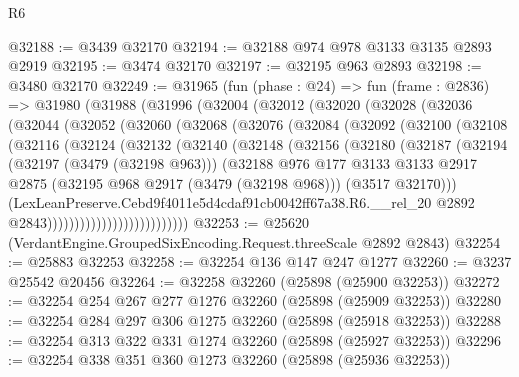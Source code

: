 \begin{lexlean}{R6}
\begin{coremodule}
@32188 := @3439 @32170
@32194 := @32188 @974 @978 @3133 @3135 @2893 @2919
@32195 := @3474 @32170
@32197 := @32195 @963 @2893
@32198 := @3480 @32170
@32249 := @31965
    (fun (phase : @24) =>
    fun (frame : @2836) =>
    @31980
      (@31988
        (@31996
          (@32004
            (@32012
              (@32020
                (@32028
                  (@32036
                    (@32044
                      (@32052
                        (@32060
                          (@32068
                            (@32076
                              (@32084
                                (@32092
                                  (@32100
                                    (@32108
                                      (@32116
                                        (@32124
                                          (@32132
                                            (@32140
                                              (@32148
                                                (@32156
                                                  (@32180
                                                    (@32187
                                                      (@32194
                                                        (@32197 (@3479 (@32198 @963)))
                                                        (@32188
                                                          @976
                                                          @177
                                                          @3133
                                                          @3133
                                                          @2917
                                                          @2875
                                                          (@32195 @968 @2917 (@3479 (@32198 @968)))
                                                          (@3517 @32170)))
                                                      (LexLeanPreserve.Cebd9f4011e5d4cdaf91cb0042ff67a38.R6.__rel_20
                                                        @2892
                                                        @2843))))))))))))))))))))))))))
@32253 := @25620 (VerdantEngine.GroupedSixEncoding.Request.threeScale @2892 @2843)
@32254 := @25883 @32253
@32258 := @32254 @136 @147 @247 @1277
@32260 := @3237 @25542 @20456
@32264 := @32258 @32260 (@25898 (@25900 @32253))
@32272 := @32254 @254 @267 @277 @1276 @32260 (@25898 (@25909 @32253))
@32280 := @32254 @284 @297 @306 @1275 @32260 (@25898 (@25918 @32253))
@32288 := @32254 @313 @322 @331 @1274 @32260 (@25898 (@25927 @32253))
@32296 := @32254 @338 @351 @360 @1273 @32260 (@25898 (@25936 @32253))

\end{coremodule}
\end{lexlean}

